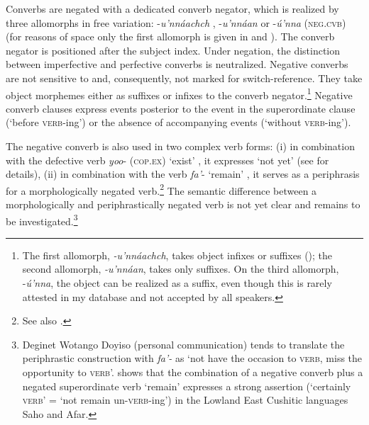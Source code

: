 \documentclass[output=paper,colorlinks,citecolor=brown,draftmode
]{langscibook}
\begin{document}
Converbs are negated with a dedicated converb negator, which is realized by three allomorphs in free variation: -\textit{u’nnáachch} , -\textit{u’nnáan}  or -\textit{ú’nna}  (\textsc{neg.cvb}) (for reasons of space only the first allomorph is given in  and ). The converb negator is positioned after the subject index. Under negation, the distinction between imperfective and perfective converbs is neutralized. Negative converbs are not sensitive to and, consequently, not marked for switch-reference. They take object morphemes either as suffixes or infixes  to the converb negator.\footnote{The first allomorph, \textit{-u’nnáachch}, takes object infixes or suffixes (); the second allomorph, \textit{-u’nnáan}, takes only suffixes. On the third allomorph, -\textit{ú’nna}, the object can be realized as a suffix, even though this is rarely attested in my database and not accepted by all speakers.}  Negative converb clauses express events posterior to the event in the superordinate clause (‘before \textsc{verb}-ing’) or the absence of accompanying events (‘without \textsc{verb}-ing’).


The negative converb is also used in two complex verb forms: (i) in combination with the defective verb \textit{yoo}- (\textsc{cop.ex}) ‘exist’ , it expresses ‘not yet’ (see \citealt{Treis2021} for details), (ii) in combination with the verb \textit{fa’}- ‘remain’ , it serves as a periphrasis for a morphologically negated verb.\footnote{See also .} The semantic difference between a morphologically and periphrastically negated verb is not yet clear and remains to be investigated.\footnote{Deginet Wotango Doyiso (personal communication) tends to translate the periphrastic construction with \textit{fa'-} as ‘not have the occasion to \textsc{verb}, miss the opportunity to \textsc{verb}’. \citet[62, 64--65]{Banti2010} shows that the combination of a negative converb plus a negated superordinate verb ‘remain' expresses a strong assertion (‘certainly \textsc{verb}' = ‘not remain un-\textsc{verb}-ing') in the Lowland East Cushitic languages Saho and Afar.} 
\end{document}
